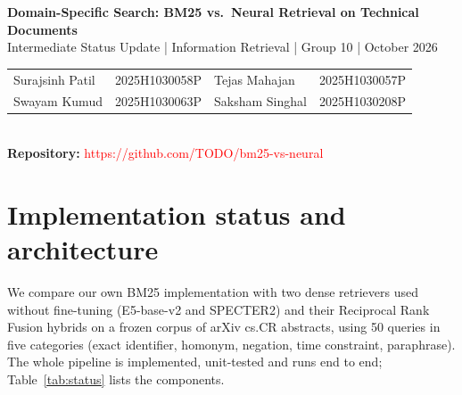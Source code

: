 \documentclass[10pt,a4paper]{article}
\newcommand{\repourl}{\textcolor{red}{https://github.com/TODO/bm25-vs-neural}}  %
\begin{document}
\begin{center}
{\Large\bfseries Domain-Specific Search: BM25 vs.\ Neural Retrieval on Technical Documents}\\[2pt]
{\large Intermediate Status Update \;|\; Information Retrieval \;|\; Group 10 \;| October 2026}\\[4pt]
\begin{tabular}{llll}
Surajsinh Patil & 2025H1030058P & Tejas Mahajan & 2025H1030057P\\
Swayam Kumud & 2025H1030063P & Saksham Singhal & 2025H1030208P
\end{tabular}\\[3pt]
\textbf{Repository:} \repourl
\end{center}

\section{Implementation status and architecture}
We compare our own BM25 implementation with two dense retrievers used without fine-tuning
(E5-base-v2 and SPECTER2) and their Reciprocal Rank Fusion hybrids on a frozen corpus of
\corpusN{} arXiv cs.CR abstracts, using 50 queries in five categories (exact identifier,
homonym, negation, time constraint, paraphrase). The whole pipeline is implemented, unit-tested
and runs end to end; Table~\ref{tab:status} lists the components.
\end{document}
